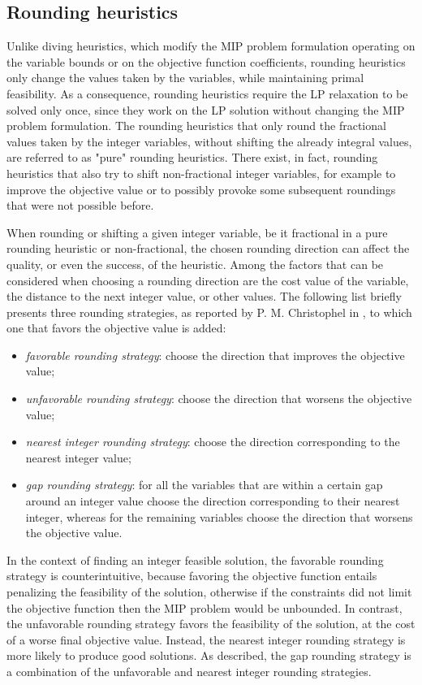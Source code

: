 \documentclass[a4paper,12pt,twoside]{scrbook}
\begin{document}
\subsection{Rounding heuristics} \label{sec:roundingheur}
Unlike diving heuristics, which modify the MIP problem formulation operating on the variable bounds or on the objective function coefficients, rounding heuristics only change the values taken by the variables, while maintaining primal feasibility. As a consequence, rounding heuristics require the LP relaxation to be solved only once, since they work on the LP solution without changing the MIP problem formulation. The rounding heuristics that only round the fractional values taken by the integer variables, without shifting the already integral values, are referred to as "pure" rounding heuristics. There exist, in fact, rounding heuristics that also try to shift non-fractional integer variables, for example to improve the objective value or to possibly provoke some subsequent roundings that were not possible before. \par
When rounding or shifting a given integer variable, be it fractional in a pure rounding heuristic or non-fractional, the chosen rounding direction can affect the quality, or even the success, of the heuristic. Among the factors that can be considered when choosing a rounding direction are the cost value of the variable, the distance to the next integer value, or other values. The following list briefly presents three rounding strategies, as reported by P. M. Christophel in \cite{christophel2005}, to which one that favors the objective value is added:
\begin{itemize}
	\item \textit{favorable rounding strategy}: choose the direction that improves the objective value;
	\item \textit{unfavorable rounding strategy}: choose the direction that worsens the objective value;
	\item \textit{nearest integer rounding strategy}: choose the direction corresponding to the nearest integer value;
	\item \textit{gap rounding strategy}: for all the variables that are within a certain gap around an integer value choose the direction corresponding to their nearest integer, whereas for the remaining variables choose the direction that worsens the objective value.
\end{itemize}
In the context of finding an integer feasible solution, the favorable rounding strategy is counterintuitive, because favoring the objective function entails penalizing the feasibility of the solution, otherwise if the constraints did not limit the objective function then the MIP problem would be unbounded. In contrast, the unfavorable rounding strategy favors the feasibility of the solution, at the cost of a worse final objective value. Instead, the nearest integer rounding strategy is more likely to produce good solutions. As described, the gap rounding strategy is a combination of the unfavorable and nearest integer rounding strategies. \par
\end{document}
